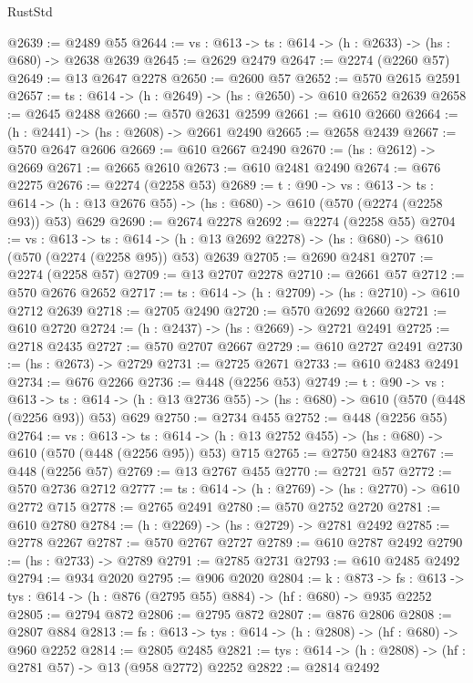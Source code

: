 \begin{lexlean}{RustStd}
\begin{coremodule}
@2639 := @2489 @55
@2644 := {vs : @613} -> {ts : @614} -> (h : @2633) -> (hs : @680) -> @2638 @2639
@2645 := @2629 @2479
@2647 := @2274 (@2260 @57)
@2649 := @13 @2647 @2278
@2650 := @2600 @57
@2652 := @570 @2615 @2591
@2657 := {ts : @614} -> (h : @2649) -> (hs : @2650) -> @610 @2652 @2639
@2658 := @2645 @2488
@2660 := @570 @2631 @2599
@2661 := @610 @2660
@2664 := (h : @2441) -> (hs : @2608) -> @2661 @2490
@2665 := @2658 @2439
@2667 := @570 @2647 @2606
@2669 := @610 @2667 @2490
@2670 := (hs : @2612) -> @2669
@2671 := @2665 @2610
@2673 := @610 @2481 @2490
@2674 := @676 @2275
@2676 := @2274 (@2258 @53)
@2689 := {t : @90} ->
  {vs : @613} ->
  {ts : @614} -> (h : @13 @2676 @55) -> (hs : @680) -> @610 (@570 (@2274 (@2258 @93)) @53) @629
@2690 := @2674 @2278
@2692 := @2274 (@2258 @55)
@2704 := {vs : @613} ->
  {ts : @614} -> (h : @13 @2692 @2278) -> (hs : @680) -> @610 (@570 (@2274 (@2258 @95)) @53) @2639
@2705 := @2690 @2481
@2707 := @2274 (@2258 @57)
@2709 := @13 @2707 @2278
@2710 := @2661 @57
@2712 := @570 @2676 @2652
@2717 := {ts : @614} -> (h : @2709) -> (hs : @2710) -> @610 @2712 @2639
@2718 := @2705 @2490
@2720 := @570 @2692 @2660
@2721 := @610 @2720
@2724 := (h : @2437) -> (hs : @2669) -> @2721 @2491
@2725 := @2718 @2435
@2727 := @570 @2707 @2667
@2729 := @610 @2727 @2491
@2730 := (hs : @2673) -> @2729
@2731 := @2725 @2671
@2733 := @610 @2483 @2491
@2734 := @676 @2266
@2736 := @448 (@2256 @53)
@2749 := {t : @90} ->
  {vs : @613} ->
  {ts : @614} -> (h : @13 @2736 @55) -> (hs : @680) -> @610 (@570 (@448 (@2256 @93)) @53) @629
@2750 := @2734 @455
@2752 := @448 (@2256 @55)
@2764 := {vs : @613} ->
  {ts : @614} -> (h : @13 @2752 @455) -> (hs : @680) -> @610 (@570 (@448 (@2256 @95)) @53) @715
@2765 := @2750 @2483
@2767 := @448 (@2256 @57)
@2769 := @13 @2767 @455
@2770 := @2721 @57
@2772 := @570 @2736 @2712
@2777 := {ts : @614} -> (h : @2769) -> (hs : @2770) -> @610 @2772 @715
@2778 := @2765 @2491
@2780 := @570 @2752 @2720
@2781 := @610 @2780
@2784 := (h : @2269) -> (hs : @2729) -> @2781 @2492
@2785 := @2778 @2267
@2787 := @570 @2767 @2727
@2789 := @610 @2787 @2492
@2790 := (hs : @2733) -> @2789
@2791 := @2785 @2731
@2793 := @610 @2485 @2492
@2794 := @934 @2020
@2795 := @906 @2020
@2804 := {k : @873} ->
  {fs : @613} -> {tys : @614} -> (h : @876 (@2795 @55) @884) -> (hf : @680) -> @935 @2252
@2805 := @2794 @872
@2806 := @2795 @872
@2807 := @876 @2806
@2808 := @2807 @884
@2813 := {fs : @613} -> {tys : @614} -> (h : @2808) -> (hf : @680) -> @960 @2252
@2814 := @2805 @2485
@2821 := {tys : @614} -> (h : @2808) -> (hf : @2781 @57) -> @13 (@958 @2772) @2252
@2822 := @2814 @2492

\end{coremodule}
\end{lexlean}
